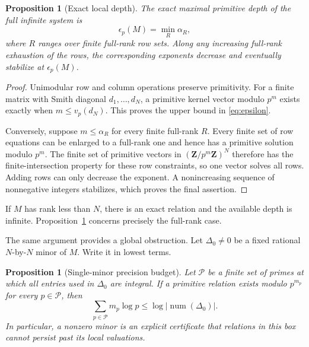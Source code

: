 \documentclass[11pt,reqno]{amsart}
\newtheorem{proposition}[theorem]{Proposition}
\theoremstyle{definition}
\theoremstyle{remark}
\newcommand{\Z}{\mathbf Z}
\begin{document}
\begin{proposition}[Exact local depth]\label{prop:smith}
The exact maximal primitive depth of the full infinite system is
\begin{equation}\label{eq:epsilon}
 \epsilon_p(M)=\min_R\alpha_R,
\end{equation}
where $R$ ranges over finite full-rank row sets.  Along any increasing
full-rank exhaustion of the rows, the corresponding exponents decrease and
eventually stabilize at $\epsilon_p(M)$.
\end{proposition}

\begin{proof}
Unimodular row and column operations preserve primitivity.  For a finite
matrix with Smith diagonal $d_1,\ldots,d_N$, a primitive kernel vector modulo
$p^m$ exists exactly when $m\leq v_p(d_N)$.  This proves the upper bound in
\eqref{eq:epsilon}.

Conversely, suppose $m\leq\alpha_R$ for every finite full-rank $R$.  Every
finite set of row equations can be enlarged to a full-rank one and hence has
a primitive solution modulo $p^m$.  The finite set of primitive vectors in
$(\Z/p^m\Z)^N$ therefore has the finite-intersection property for these row
constraints, so one vector solves all rows.  Adding rows can only decrease
the exponent.  A nonincreasing sequence of nonnegative integers stabilizes,
which proves the final assertion.
\end{proof}

If $M$ has rank less than $N$, there is an exact relation and the available
depth is infinite.  Proposition~\ref{prop:smith} concerns precisely the
full-rank case.

The same argument provides a global obstruction.  Let $\Delta_0\neq0$ be a
fixed rational $N$-by-$N$ minor of $M$.  Write it in lowest terms.

\begin{proposition}[Single-minor precision budget]\label{prop:budget}
Let $\mathcal P$ be a finite set of primes at which all entries used in
$\Delta_0$ are integral.  If a primitive relation exists modulo $p^{m_p}$
for every $p\in\mathcal P$, then
\begin{equation}\label{eq:budget}
 \sum_{p\in\mathcal P}m_p\log p
 \leq\log|\operatorname{num}(\Delta_0)|.
\end{equation}
In particular, a nonzero minor is an explicit certificate that relations in
this box cannot persist past its local valuations.
\end{proposition}
\end{document}
